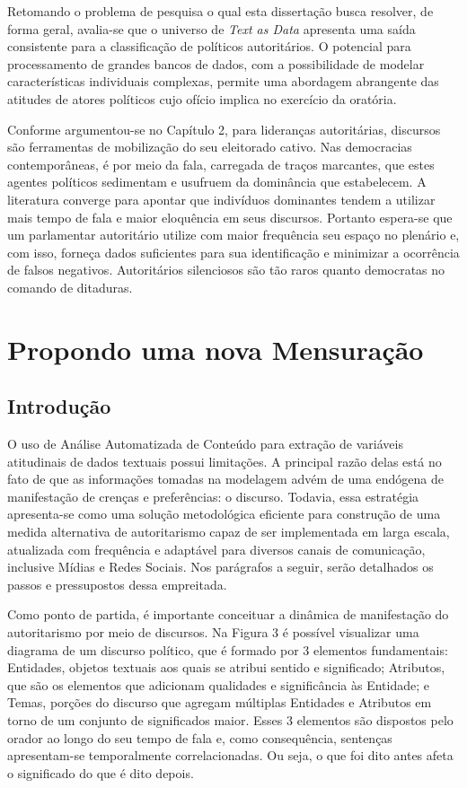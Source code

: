 \documentclass[
12pt,				%
openright,			%
twoside,			%
a4paper,			%
english,			%
french,				%
spanish,			%
brazil				%
]{abntex2}
\begin{document}
Retomando o problema de pesquisa o qual esta dissertação busca resolver, de forma geral, avalia-se que o universo de \emph{Text as Data} apresenta uma saída consistente para a classificação de políticos autoritários. O potencial para processamento de grandes bancos de dados, com a possibilidade de modelar características individuais complexas, permite uma abordagem abrangente das atitudes de atores políticos cujo ofício implica no exercício da oratória.

Conforme argumentou-se no Capítulo 2, para lideranças autoritárias, discursos são ferramentas de mobilização do seu eleitorado cativo. Nas democracias contemporâneas, é por meio da fala, carregada de traços marcantes, que estes agentes políticos sedimentam e usufruem da dominância que estabelecem. A literatura converge para apontar que indivíduos dominantes tendem a utilizar mais tempo de fala e maior eloquência em seus discursos. Portanto espera-se que um parlamentar autoritário utilize com maior frequência seu espaço no plenário e, com isso, forneça dados suficientes para sua identificação e minimizar a ocorrência de falsos negativos. Autoritários silenciosos são tão raros quanto democratas no comando de ditaduras. 

\chapter{Propondo uma nova Mensuração}

\section{Introdução}

O uso de Análise Automatizada de Conteúdo para extração de variáveis atitudinais de dados textuais possui limitações. A principal razão delas está no fato de que as informações tomadas na modelagem advém de uma endógena de manifestação de crenças e preferências: o discurso. Todavia, essa estratégia apresenta-se como uma solução metodológica eficiente para construção de uma medida alternativa de autoritarismo capaz de ser implementada em larga escala, atualizada com frequência e adaptável para diversos canais de comunicação, inclusive Mídias e Redes Sociais. Nos parágrafos a seguir, serão detalhados os passos e pressupostos dessa empreitada.

Como ponto de partida, é importante conceituar a dinâmica de manifestação do autoritarismo por meio de discursos. Na Figura 3 é possível visualizar uma diagrama de um discurso político, que é formado por 3 elementos fundamentais: Entidades, objetos textuais aos quais se atribui sentido e significado; Atributos, que são os elementos que adicionam qualidades e significância às Entidade; e Temas, porções do discurso que agregam múltiplas Entidades e Atributos em torno de um conjunto de significados maior. Esses 3 elementos são dispostos pelo orador ao longo do seu tempo de fala e, como consequência, sentenças apresentam-se temporalmente correlacionadas. Ou seja, o que foi dito antes afeta o significado do que é dito depois.
\end{document}
